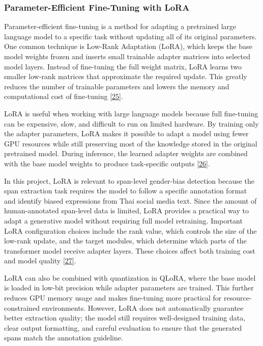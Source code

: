 \documentclass[12pt,oneside,openright,a4paper]{cpe-english-project}
\begin{document}
\subsubsection{Parameter-Efficient Fine-Tuning with LoRA}

Parameter-efficient fine-tuning is a method for adapting a pretrained large language model to a specific task without updating all of its original parameters. One common technique is Low-Rank Adaptation (LoRA), which keeps the base model weights frozen and inserts small trainable adapter matrices into selected model layers. Instead of fine-tuning the full weight matrix, LoRA learns two smaller low-rank matrices that approximate the required update. This greatly reduces the number of trainable parameters and lowers the memory and computational cost of fine-tuning \hyperlink{bib:ref25}{[25]}.

LoRA is useful when working with large language models because full fine-tuning can be expensive, slow, and difficult to run on limited hardware. By training only the adapter parameters, LoRA makes it possible to adapt a model using fewer GPU resources while still preserving most of the knowledge stored in the original pretrained model. During inference, the learned adapter weights are combined with the base model weights to produce task-specific outputs \hyperlink{bib:ref26}{[26]}.

In this project, LoRA is relevant to span-level gender-bias detection because the span extraction task requires the model to follow a specific annotation format and identify biased expressions from Thai social media text. Since the amount of human-annotated span-level data is limited, LoRA provides a practical way to adapt a generative model without requiring full model retraining. Important LoRA configuration choices include the rank value, which controls the size of the low-rank update, and the target modules, which determine which parts of the transformer model receive adapter layers. These choices affect both training cost and model quality \hyperlink{bib:ref27}{[27]}.

LoRA can also be combined with quantization in QLoRA, where the base model is loaded in low-bit precision while adapter parameters are trained. This further reduces GPU memory usage and makes fine-tuning more practical for resource-constrained environments. However, LoRA does not automatically guarantee better extraction quality; the model still requires well-designed training data, clear output formatting, and careful evaluation to ensure that the generated spans match the annotation guideline.
\end{document}
